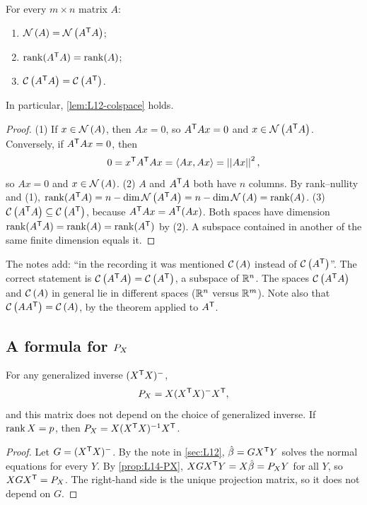 \begin{theorem}\label{thm:L14-colspace}
For every $m\times n$ matrix $A$:
\begin{enumerate}
  \item $\mathcal{N}\left(A\right)=\mathcal{N}\left(A^{\mathsf T} A\right)$;
  \item $\operatorname{rank}(A^{\mathsf T} A)=\operatorname{rank}(A)$;
  \item $\mathcal{C}\left(A^{\mathsf T} A\right)=\mathcal{C}\left(A^{\mathsf T}\right)$.
\end{enumerate}
In particular, \cref{lem:L12-colspace} holds.
\end{theorem}
\begin{proof}
(1) If $x\in\mathcal{N}\left(A\right)$, then $Ax=0$, so $A^{\mathsf T} Ax=0$ and $x\in\mathcal{N}\left(A^{\mathsf T} A\right)$. Conversely, if $A^{\mathsf T} Ax=0$, then
\[
0=x^{\mathsf T} A^{\mathsf T} Ax=\langle Ax,Ax\rangle=\left|\left|Ax\right|\right|^2 ,
\]
so $Ax=0$ and $x\in\mathcal{N}\left(A\right)$.
(2) $A$ and $A^{\mathsf T} A$ both have $n$ columns. By rank--nullity and (1),
$\operatorname{rank}(A^{\mathsf T} A)=n-\dim\mathcal{N}\left(A^{\mathsf T} A\right)=n-\dim\mathcal{N}\left(A\right)=\operatorname{rank}(A)$.
(3) $\mathcal{C}\left(A^{\mathsf T} A\right)\subseteq\mathcal{C}\left(A^{\mathsf T}\right)$, because $A^{\mathsf T} Ax=A^{\mathsf T}(Ax)$. Both spaces have dimension $\operatorname{rank}(A^{\mathsf T} A)=\operatorname{rank}(A)=\operatorname{rank}(A^{\mathsf T})$
by (2). A subspace contained in another of the same finite dimension equals it.
\end{proof}
\begin{note}
The notes add: ``in the recording it was mentioned $\mathcal{C}\left(A\right)$ instead of $\mathcal{C}\left(A^{\mathsf T}\right)$''. The correct statement
is $\mathcal{C}\left(A^{\mathsf T} A\right)=\mathcal{C}\left(A^{\mathsf T}\right)$, a subspace of $\mathbb R^n$. The spaces $\mathcal{C}\left(A^{\mathsf T} A\right)$ and $\mathcal{C}\left(A\right)$ in general lie in
different spaces ($\mathbb R^n$ versus $\mathbb R^m$). Note also that $\mathcal{C}\left(AA^{\mathsf T}\right)=\mathcal{C}\left(A\right)$, by the theorem applied to $A^{\mathsf T}$.
\end{note}

\subsection{A formula for $P_X$}
\begin{proposition}\label{prop:L14-PXformula}
For any generalized inverse $(X^{\mathsf T} X)^{-}$,
\[
P_X=X(X^{\mathsf T} X)^{-}X^{\mathsf T} ,
\]
and this matrix does not depend on the choice of generalized inverse. If $\operatorname{rank} X=p$, then $P_X=X(X^{\mathsf T} X)^{-1}X^{\mathsf T}$.
\end{proposition}
\begin{proof}
Let $G=(X^{\mathsf T} X)^{-}$. By the note in \cref{sec:L12}, $\hat\beta=GX^{\mathsf T} Y$ solves the normal equations for every $Y$. By
\cref{prop:L14-PX}, $XGX^{\mathsf T} Y=X\hat\beta=P_X Y$ for all $Y$, so $XGX^{\mathsf T}=P_X$. The right-hand side is the unique projection matrix, so it
does not depend on $G$.
\end{proof}

